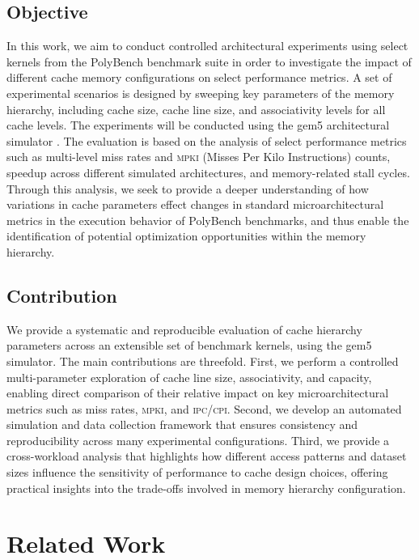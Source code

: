 \documentclass[conference]{IEEEtran}
\begin{document}
\subsection{Objective}

In this work, we aim to conduct controlled architectural experiments using
select kernels from the PolyBench benchmark suite \cite{polybench:2016} in
order to investigate the impact of different cache memory configurations on
select performance metrics. A set of experimental scenarios is designed by
sweeping key parameters of the memory hierarchy, including cache size, cache
line size, and associativity levels for all cache levels. The experiments will
be conducted using the gem5 architectural simulator \cite{gem5-20:2007}. The
evaluation is based on the analysis of select performance metrics such as
multi-level miss rates and \textsc{mpki} (Misses Per Kilo Instructions) counts,
speedup across different simulated architectures, and memory-related stall
cycles. Through this analysis, we seek to provide a deeper understanding of how
variations in cache parameters effect changes in standard microarchitectural
metrics in the execution behavior of PolyBench benchmarks, and thus enable the
identification of potential optimization opportunities within the memory
hierarchy.

\subsection{Contribution}

We provide a systematic and reproducible evaluation of cache hierarchy
parameters across an extensible set of benchmark kernels, using the gem5
simulator. The main contributions are threefold. First, we perform a controlled
multi-parameter exploration of cache line size, associativity, and capacity,
enabling direct comparison of their relative impact on key microarchitectural
metrics such as miss rates, \textsc{mpki}, and \textsc{ipc}/\textsc{cpi}.
Second, we develop an automated simulation and data collection framework that
ensures consistency and reproducibility across many experimental
configurations. Third, we provide a cross-workload analysis that highlights how
different access patterns and dataset sizes influence the sensitivity of
performance to cache design choices, offering practical insights into the
trade-offs involved in memory hierarchy configuration.

\section{Related Work}
\end{document}
